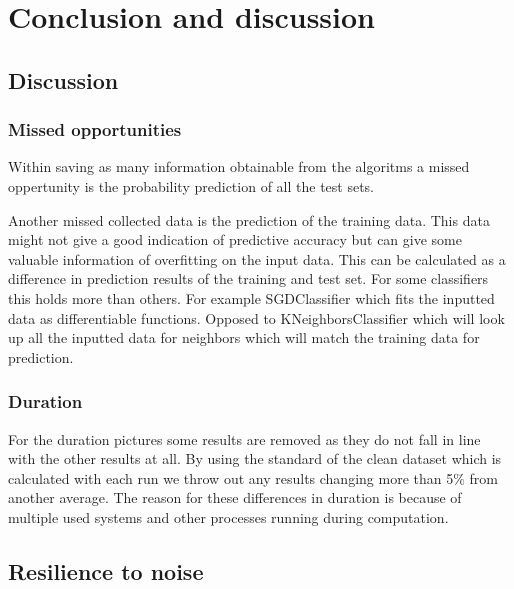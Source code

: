 \documentclass[a4paper,10pt]{article}
\begin{document}






\newpage
\section{Conclusion and discussion} \label{Chapter5}

\subsection{Discussion}

\subsubsection{Missed opportunities}
Within saving as many information obtainable from the algoritms a missed oppertunity is the probability prediction of all the test sets. 

Another missed collected data is the prediction of the training data. This data might not give a good indication of predictive accuracy but can give some valuable information of overfitting on the input data. This can be calculated as a difference in prediction results of the training and test set. For some classifiers this holds more than others. For example SGDClassifier which fits the inputted data as differentiable functions. Opposed to KNeighborsClassifier which will look up all the inputted data for neighbors which will match the training data for prediction. 

\subsubsection{Duration}
For the duration pictures some results are removed as they do not fall in line with the other results at all. By using the standard of the clean dataset which is calculated with each run we throw out any results changing more than 5$\%$ from another average.
The reason for these differences in duration is because of multiple used systems and other processes running during computation. 

\subsection{Resilience to noise}
\end{document}
